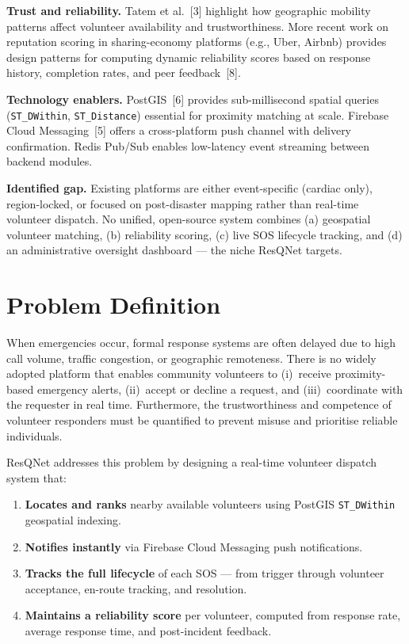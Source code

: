 \documentclass[12pt]{article}
\begin{document}
\textbf{Trust and reliability.}
Tatem et al.~[3] highlight how geographic mobility patterns affect volunteer availability and trustworthiness. More recent work on reputation scoring in sharing-economy platforms (e.g., Uber, Airbnb) provides design patterns for computing dynamic reliability scores based on response history, completion rates, and peer feedback~[8].

\textbf{Technology enablers.}
PostGIS~[6] provides sub-millisecond spatial queries (\texttt{ST\_DWithin}, \texttt{ST\_Distance}) essential for proximity matching at scale. Firebase Cloud Messaging~[5] offers a cross-platform push channel with delivery confirmation. Redis Pub/Sub enables low-latency event streaming between backend modules.

\textbf{Identified gap.}
Existing platforms are either event-specific (cardiac only), region-locked, or focused on post-disaster mapping rather than real-time volunteer dispatch. No unified, open-source system combines (a) geospatial volunteer matching, (b) reliability scoring, (c) live SOS lifecycle tracking, and (d) an administrative oversight dashboard --- the niche ResQNet targets.

\section{Problem Definition}
When emergencies occur, formal response systems are often delayed due to high call volume, traffic congestion, or geographic remoteness. There is no widely adopted platform that enables community volunteers to (i)~receive proximity-based emergency alerts, (ii)~accept or decline a request, and (iii)~coordinate with the requester in real time. Furthermore, the trustworthiness and competence of volunteer responders must be quantified to prevent misuse and prioritise reliable individuals.

ResQNet addresses this problem by designing a real-time volunteer dispatch system that:
\begin{enumerate}[nosep, label=(\alph*), leftmargin=1.6em]
  \item \textbf{Locates and ranks} nearby available volunteers using PostGIS \texttt{ST\_DWithin} geospatial indexing.
  \item \textbf{Notifies instantly} via Firebase Cloud Messaging push notifications.
  \item \textbf{Tracks the full lifecycle} of each SOS --- from trigger through volunteer acceptance, en-route tracking, and resolution.
  \item \textbf{Maintains a reliability score} per volunteer, computed from response rate, average response time, and post-incident feedback.
\end{enumerate}
\end{document}
